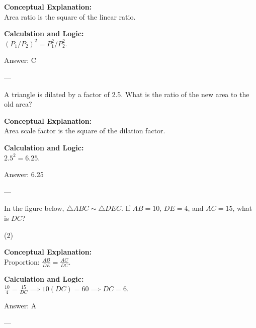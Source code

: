 \documentclass[11pt,paper=a4,answers]{exam}
\begin{document}
\begin{questions}
\begin{solution}
\textbf{Conceptual Explanation:} \\
Area ratio is the square of the linear ratio.

\vspace{10pt}
\textbf{Calculation and Logic:} \\
$(P_1/P_2)^2 = P_1^2/P_2^2$.

\vspace{15pt}
Answer: \colorbox{yellow!100}{C}
\end{solution}

---

\question
A triangle is dilated by a factor of 2.5. What is the ratio of the new area to the old area?

\begin{solution}
\textbf{Conceptual Explanation:} \\
Area scale factor is the square of the dilation factor.

\vspace{10pt}
\textbf{Calculation and Logic:} \\
$2.5^2 = 6.25$.

\vspace{15pt}
Answer: \colorbox{yellow!100}{6.25}
\end{solution}

---

\question
In the figure below, $\triangle ABC \sim \triangle DEC$. If $AB = 10$, $DE = 4$, and $AC = 15$, what is $DC$?
\begin{tasks}(2)
\end{tasks}

\begin{solution}
\textbf{Conceptual Explanation:} \\
Proportion: $\frac{AB}{DE} = \frac{AC}{DC}$.

\vspace{10pt}
\textbf{Calculation and Logic:} \\
$\frac{10}{4} = \frac{15}{DC} \implies 10(DC) = 60 \implies DC = 6$.

\vspace{15pt}
Answer: \colorbox{yellow!100}{A}
\end{solution}

---


\end{questions}
\end{document}
